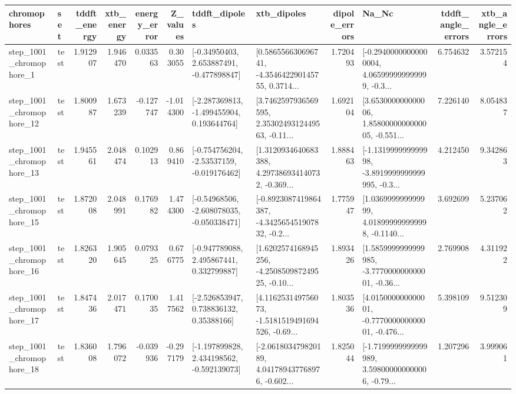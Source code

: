 \begin{tabular}{llrrrrllrlrr}
\toprule
             chromophores &       set &  tddft\_energy &  xtb\_energy &  energy\_error &  Z\_values &                               tddft\_dipoles &                                        xtb\_dipoles &  dipole\_errors &                                              Na\_Nc &  tddft\_angle\_errors &  xtb\_angle\_errors \\
\midrule
  step\_1001\_chromophore\_1 &      test &      1.912907 &    1.946470 &      0.033563 &  0.303055 &    [-0.34950403, 2.653887491, -0.477898847] &  [0.586556630696741, -4.354642290145755, 0.3714... &       1.720493 &  [-0.29400000000000004, 4.065999999999999, -0.3... &            6.754632 &          3.572154 \\
 step\_1001\_chromophore\_12 &      test &      1.800987 &    1.673239 &     -0.127747 & -1.014300 &   [-2.287369813, -1.499455904, 0.193644764] &  [3.7462597936569595, 2.3530249312449563, -0.11... &       1.692104 &  [3.653000000000006, 1.8580000000000005, -0.551... &            7.226140 &          8.054837 \\
 step\_1001\_chromophore\_13 &      test &      1.945561 &    2.048474 &      0.102913 &  0.869410 &   [-0.754756204, -2.53537159, -0.019176462] &  [1.3120934640683388, 4.297386934140732, -0.369... &       1.888463 &  [-1.131999999999998, -3.8919999999999995, -0.3... &            4.212450 &          9.342863 \\
 step\_1001\_chromophore\_15 &      test &      1.872008 &    2.048991 &      0.176982 &  1.474300 &   [-0.54968506, -2.608078035, -0.050338471] &  [-0.8923087419864387, -4.342565451907832, -0.2... &       1.775947 &  [1.036999999999999, 4.018999999999998, -0.1140... &            3.692699 &          5.237062 \\
 step\_1001\_chromophore\_16 &      test &      1.826320 &    1.905645 &      0.079325 &  0.676775 &    [-0.947789088, 2.495867441, 0.332799887] &  [1.6202574168945256, -4.250850987249525, -0.10... &       1.893426 &  [1.5859999999999985, -3.777000000000001, -0.36... &            2.769908 &          4.311922 \\
 step\_1001\_chromophore\_17 &      test &      1.847436 &    2.017471 &      0.170035 &  1.417562 &     [-2.526853947, 0.738836132, 0.35388166] &  [4.116253149756073, -1.5181519491694526, -0.69... &       1.803536 &  [4.015000000000001, -0.777000000000001, -0.476... &            5.398109 &          9.512309 \\
 step\_1001\_chromophore\_18 &      test &      1.836008 &    1.796072 &     -0.039936 & -0.297179 &   [-1.197899828, 2.434198562, -0.592139073] &  [-2.061803479820189, 4.041789437768976, -0.602... &       1.825044 &  [-1.7199999999999989, 3.598000000000006, -0.79... &            1.207296 &          3.999061 \\

\end{tabular}
